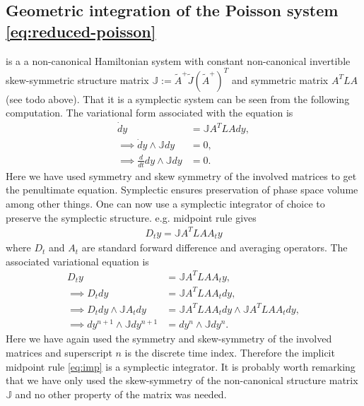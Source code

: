 \documentclass[12pt]{article}
\begin{document}
\subsection{Geometric integration of the Poisson system \eqref{eq:reduced-poisson} }
 is a a non-canonical Hamiltonian system with constant non-canonical invertible skew-symmetric structure matrix $\mathbb{J} := \tilde A ^+ \tilde J (\tilde A ^+)^T$ and symmetric matrix $A^T L A$ (see todo above). That it is a symplectic system can be seen from the following computation. The variational form associated with the equation is
\begin{align*}
\dot dy &= \mathbb{J} A^T L A dy, \\
\implies \dot dy \wedge \mathbb{J}dy &= 0, \\
\implies \frac{d}{dt} dy \wedge \mathbb{J}dy &= 0.
\end{align*}
Here we have used symmetry and skew symmetry of the involved matrices to get the penultimate equation. Symplectic ensures preservation of phase space volume among other things. One can now use a symplectic integrator of choice to preserve the symplectic structure. e.g. midpoint rule gives
\begin{align} \label{eq:imp}
D_t y = \mathbb{J} A^T L A A_t y
\end{align}
where $D_t$ and $A_t$ are standard forward difference and averaging operators. The associated variational equation is
\begin{align*}
D_t y &= \mathbb{J} A^T L A A_t y,\\
\implies D_t dy &= \mathbb{J} A^T L A A_t dy, \\
\implies D_t dy \wedge \mathbb{J} A_t dy &= \mathbb{J} A^T L A A_t dy \wedge \mathbb{J} A^T L A A_t dy, \\
\implies dy^{n+1} \wedge \mathbb{J} dy^{n+1} &= dy^{n} \wedge \mathbb{J} dy^{n}.
\end{align*}
Here we have again used the symmetry and skew-symmetry of the involved matrices and superscript $n$ is the discrete time index. Therefore the implicit midpoint rule \eqref{eq:imp} is a symplectic integrator. It is probably worth remarking that we have only used the skew-symmetry of the non-canonical structure matrix $\mathbb{J}$ and no other property of the matrix was needed.
\end{document}

